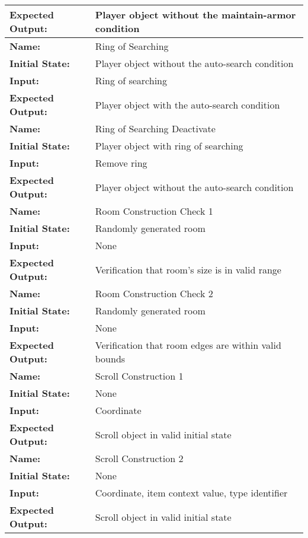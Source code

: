 \documentclass[12pt, titlepage]{article}
\begin{document}
\begin{center}
\begin{longtable}{ l | p{10cm} }
				\textbf{Expected Output:} & Player object without the maintain-armor condition\\[1em]
				\hline
				\rule{0pt}{2em}\textbf{Name:} & Ring of Searching\\
				\textbf{Initial State:} & Player object without the auto-search condition\\
				\textbf{Input:} & Ring of searching\\
				\textbf{Expected Output:} & Player object with the auto-search condition\\[1em]
				\hline
				\rule{0pt}{2em}\textbf{Name:} & Ring of Searching Deactivate\\
				\textbf{Initial State:} & Player object with ring of searching\\
				\textbf{Input:} & Remove ring\\
				\textbf{Expected Output:} & Player object without the auto-search condition\\[1em]
				\hline
				\rule{0pt}{2em}\textbf{Name:} & Room Construction Check 1\\
				\textbf{Initial State:} & Randomly generated room\\
				\textbf{Input:} & None\\
				\textbf{Expected Output:} & Verification that room's size is in valid range\\[1em]
				\hline
				\rule{0pt}{2em}\textbf{Name:} & Room Construction Check 2\\
				\textbf{Initial State:} & Randomly generated room\\
				\textbf{Input:} & None\\
				\textbf{Expected Output:} & Verification that room edges are within valid bounds\\[1em]
				\hline
				\rule{0pt}{2em}\textbf{Name:} & Scroll Construction 1\\
				\textbf{Initial State:} & None\\
				\textbf{Input:} & Coordinate\\
				\textbf{Expected Output:} & Scroll object in valid initial state\\[1em]
				\hline
				\rule{0pt}{2em}\textbf{Name:} & Scroll Construction 2\\
				\textbf{Initial State:} & None\\
				\textbf{Input:} & Coordinate, item context value, type identifier\\
				\textbf{Expected Output:} & Scroll object in valid initial state\\[1em]

\end{longtable}
\end{center}
\end{document}
